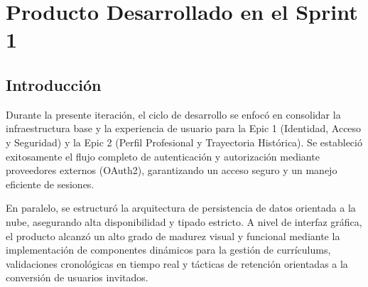\chapter{Producto Desarrollado en el Sprint 1}
\label{chap:sprint1}

\section{Introducción}
\label{sec:intro_sprint}

Durante la presente iteración, el ciclo de desarrollo se enfocó en consolidar la infraestructura base y la experiencia de usuario para la Epic 1 (Identidad, Acceso y Seguridad) y la Epic 2 (Perfil Profesional y Trayectoria Histórica). Se estableció exitosamente el flujo completo de autenticación y autorización mediante proveedores externos (OAuth2), garantizando un acceso seguro y un manejo eficiente de sesiones.

En paralelo, se estructuró la arquitectura de persistencia de datos orientada a la nube, asegurando alta disponibilidad y tipado estricto. A nivel de interfaz gráfica, el producto alcanzó un alto grado de madurez visual y funcional mediante la implementación de componentes dinámicos para la gestión de currículums, validaciones cronológicas en tiempo real y tácticas de retención orientadas a la conversión de usuarios invitados.